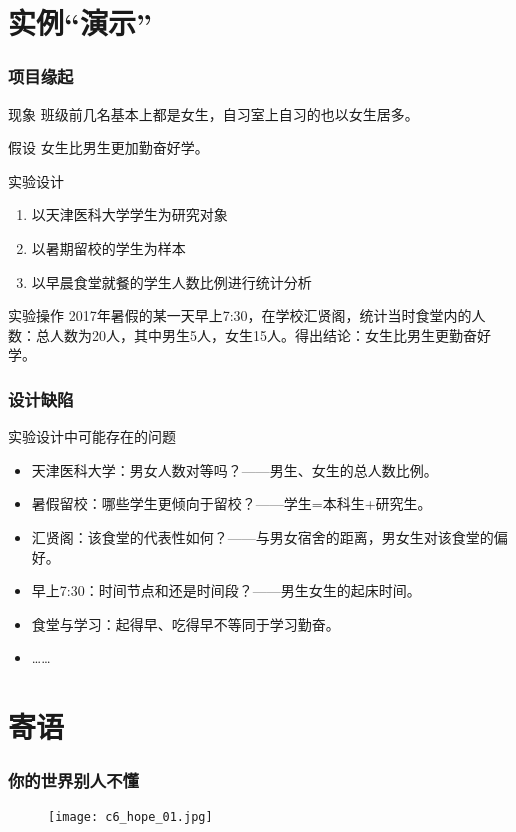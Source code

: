 \section{实例“演示”}
\begin{frame}
  \frametitle{项目缘起}
  \begin{block}{现象}
    班级前几名基本上都是女生，自习室上自习的也以女生居多。
  \end{block}
  \vspace{-0.5em}
  \pause
  \begin{block}{假设}
    女生比男生更加勤奋好学。
  \end{block}
  \pause
  \begin{block}{实验设计}
    \begin{enumerate}[<+->]
      \item 以天津医科大学学生为研究对象
      \item 以暑期留校的学生为样本
      \item 以早晨食堂就餐的学生人数比例进行统计分析
    \end{enumerate}
  \end{block}
  \vspace{-0.5em}
  \pause
  \begin{block}{实验操作}
    2017年暑假的某一天早上7:30，在学校汇贤阁，统计当时食堂内的人数：总人数为20人，其中男生5人，女生15人。得出结论：女生比男生更勤奋好学。
  \end{block}
\end{frame}

\begin{frame}
  \frametitle{设计缺陷}
  \begin{block}{实验设计中可能存在的问题}
    \begin{itemize}
      \item 天津医科大学：男女人数对等吗？——男生、女生的总人数比例。
      \item 暑假留校：哪些学生更倾向于留校？——学生=本科生+研究生。
      \item 汇贤阁：该食堂的代表性如何？——与男女宿舍的距离，男女生对该食堂的偏好。
      \item 早上7:30：时间节点和还是时间段？——男生女生的起床时间。
      \item 食堂与学习：起得早、吃得早不等同于学习勤奋。
      \item ……
    \end{itemize}
  \end{block}
\end{frame}

\section{寄语}
\begin{frame}
  \frametitle{你的世界别人不懂}
  \begin{figure}
    \centering
    \texttt{[image: c6\_hope\_01.jpg]}
  \end{figure}
\end{frame}

